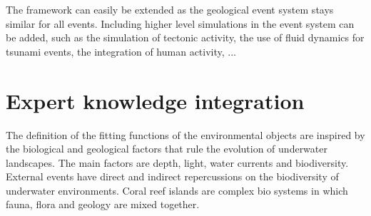 The framework can easily be extended as the geological event system stays similar for all events. Including higher level simulations in the event system can be added, such as the simulation of tectonic activity, the use of fluid dynamics for tsunami events, the integration of human activity, ...

\section{Expert knowledge integration}
\label{sec:env-obj-biology}
  The definition of the fitting functions of the environmental objects are inspired by the biological and geological factors that rule the evolution of underwater landscapes. The main factors are depth, light, water currents and biodiversity. External events have direct and indirect repercussions on the biodiversity of underwater environments. Coral reef islands are complex bio systems in which fauna, flora and geology are mixed together. 

